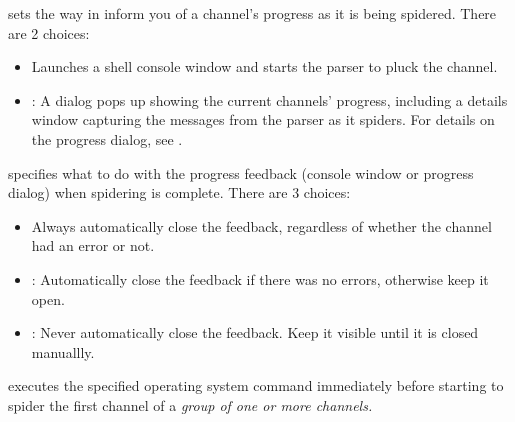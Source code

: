  sets the way in inform you of a 
channel's progress as it is being spidered. There are 2 choices:

\begin{itemize}
  \item {} Launches a shell console window
  and starts the parser to pluck the channel. 

  \item {}:  A dialog pops up showing the
  current channels' progress, including a details window capturing the messages 
  from the parser as it spiders. For details on the progress dialog, see
  \helpignore{\ref{sec:pd-progress-dialog}}
  .
\end{itemize}



 specifies what to do with the 
progress feedback (console window or progress dialog) when spidering is 
complete. There are 3 choices:

\begin{itemize}
  \item {} Always automatically close the feedback, 
  regardless of whether the channel had an error or not. 

  \item {}: Automatically close the feedback 
  if there was no errors, otherwise keep it open. \notimplemented
  
  \item {}: Never automatically close the feedback. Keep it 
  visible until it is closed manuallly.
\end{itemize}

 executes 
the specified operating system command immediately before starting to spider 
the first channel of a \em{group} of one or more channels.

